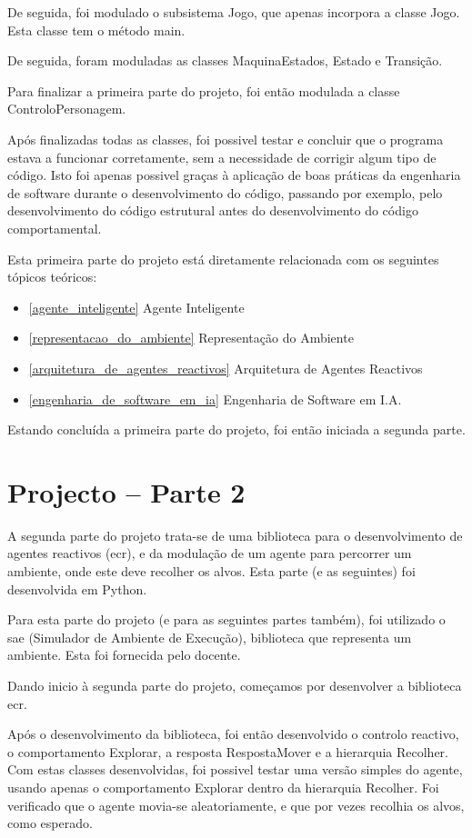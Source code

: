 \documentclass[a4paper,12pt]{article}
\begin{document}
De seguida, foi modulado o subsistema Jogo, que apenas incorpora a classe Jogo.
Esta classe tem o método main.

De seguida, foram moduladas as classes MaquinaEstados, Estado e Transição.

Para finalizar a primeira parte do projeto, foi então modulada a classe ControloPersonagem.

Após finalizadas todas as classes, foi possivel testar e concluir que o programa estava a funcionar corretamente, sem a necessidade de corrigir algum tipo de código. Isto foi apenas possivel graças à aplicação de boas práticas da engenharia de software durante o desenvolvimento do código, passando por exemplo, pelo desenvolvimento do código estrutural antes do desenvolvimento do código comportamental.

Esta primeira parte do projeto está diretamente relacionada com os seguintes tópicos teóricos:

\begin{itemize}
	\item \ref{agente_inteligente} Agente Inteligente
	\item \ref{representacao_do_ambiente} Representação do Ambiente
	\item \ref{arquitetura_de_agentes_reactivos} Arquitetura de Agentes Reactivos
	\item \ref{engenharia_de_software_em_ia} Engenharia de Software em I.A.
\end{itemize}

Estando concluída a primeira parte do projeto, foi então iniciada a segunda parte.

\newpage
\section{Projecto – Parte 2}
A segunda parte do projeto trata-se de uma biblioteca para o desenvolvimento de agentes reactivos (ecr), e da modulação de um agente para percorrer um ambiente, onde este deve recolher os alvos. Esta parte (e as seguintes) foi desenvolvida em Python.

Para esta parte do projeto (e para as seguintes partes também), foi utilizado o sae (Simulador de Ambiente de Execução), biblioteca que representa um ambiente. Esta foi fornecida pelo docente.

Dando inicio à segunda parte do projeto, começamos por desenvolver a biblioteca ecr.

Após o desenvolvimento da biblioteca, foi então desenvolvido o controlo reactivo, o comportamento Explorar, a resposta RespostaMover e a hierarquia Recolher.
Com estas classes desenvolvidas, foi possivel testar uma versão simples do agente, usando apenas o comportamento Explorar dentro da hierarquia Recolher. Foi verificado que o agente movia-se aleatoriamente, e que por vezes recolhia os alvos, como esperado.
\end{document}
